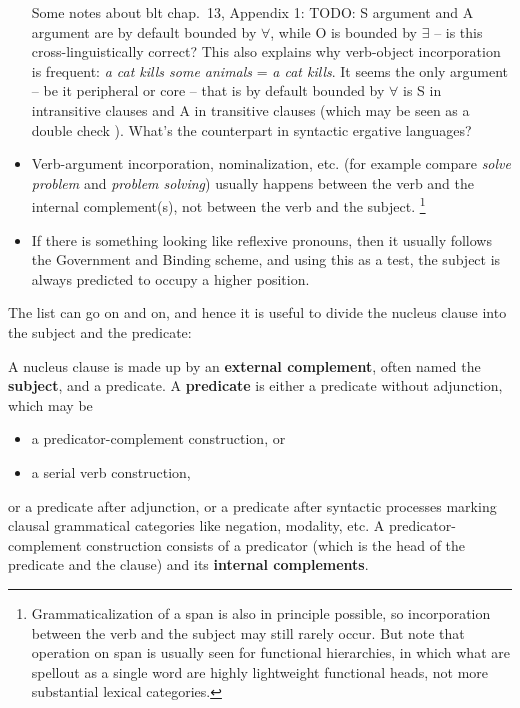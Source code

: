 \documentclass{article}
\newcommand*{\citechap}[1]{chap.~{#1}}
\newcommand*{\concept}[1]{\textbf{#1}}
\newcommand*{\corpus}[1]{\emph{#1}}
\begin{document}
\begin{itemize}
    Some notes about \ac{blt} \citechap{13}, Appendix 1: 
    TODO: S argument and A argument are by default bounded by $\forall$,
    while O is bounded by $\exists$ -- is this cross-linguistically correct?
    This also explains why verb-object incorporation is frequent:
    \corpus{a cat kills some animals} = \corpus{a cat kills}.
    It seems the only argument -- be it peripheral or core -- 
    that is by default bounded by $\forall$ is S in intransitive clauses and A in transitive clauses
    (which may be seen as a double check ).
    What's the counterpart in syntactic ergative languages?
    \item Verb-argument incorporation, nominalization, etc. 
    (for example compare \corpus{solve problem} and \corpus{problem solving}) 
    usually happens between the verb and the internal complement(s),
    not between the verb and the subject.%
    \footnote{
        Grammaticalization of a span is also in principle possible,
        so incorporation between the verb and the subject 
        may still rarely occur.
        But note that operation on span is usually seen for functional hierarchies,
        in which what are spellout as a single word 
        are highly lightweight functional heads, 
        not more substantial lexical categories.
    }
    \item If there is something looking like reflexive pronouns, 
    then it usually follows the Government and Binding scheme,
    and using this as a test,
    the subject is always predicted to occupy a higher position.
\end{itemize}
The list can go on and on, and hence it is useful to divide the nucleus clause into 
the subject and the predicate:
\begin{exe}
    \ex\label{ex:subject-predicate} A nucleus clause is made up by an \concept{external complement}, often named the \concept{subject},
    and a predicate.
    \ex\label{ex:predicate-as-vp} A \concept{predicate} is either a predicate without adjunction, which may be 
    \begin{itemize}
        \item a predicator-complement construction, or 
        \item a serial verb construction, 
    \end{itemize} 
    or a predicate after adjunction,
    or a predicate after syntactic processes marking clausal grammatical categories like 
    negation, modality, etc.
    \ex\label{ex:predicator-complement} A predicator-complement construction consists of 
    a predicator (which is the head of the predicate and the clause) 
    and its \concept{internal complements}.
\end{exe}
\end{document}

